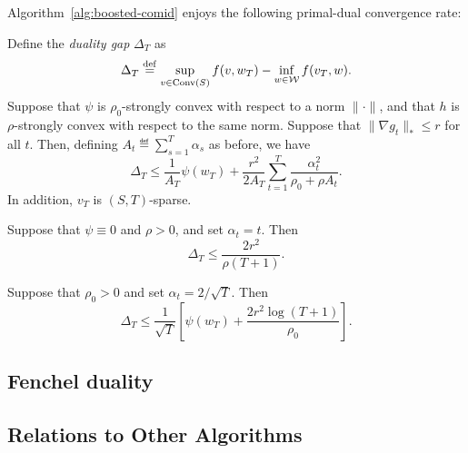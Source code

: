 \documentclass[paper.tex]{subfiles}
\begin{document}
Algorithm~\ref{alg:boosted-comid} enjoys the following primal-dual convergence rate:
\begin{theorem}
Define the \emph{duality gap} $\Delta_T$ as
\[ \Delta_T \stackrel{\mathrm{def}}{=} \sup_{v \in \operatorname{Conv}(S)} f(v, w_T) - \inf_{w \in \mathcal{W}} f(v_T, w). \]
Suppose that $\psi$ is $\rho_0$-strongly convex with 
respect to a norm $\|\cdot\|$, and that $h$ is $\rho$-strongly 
convex with respect to the same norm. Suppose that 
$\|\nabla g_t\|_* \leq r$ for all $t$. Then, defining 
$A_t \eqdef \sum_{s=1}^T \alpha_s$ as before, we have
\[ \Delta_T \leq \frac{1}{A_T} \psi(w_T) + \frac{r^2}{2A_T} \sum_{t=1}^T \frac{\alpha_t^2}{\rho_0 + \rho A_t}. \]
In addition, $v_T$ is $(S, T)$-sparse.
\end{theorem}
\begin{corollary}
Suppose that $\psi \equiv 0$ and $\rho > 0$, and set $\alpha_t = t$. Then 
\[ \Delta_T \leq \frac{2r^2}{\rho (T+1)}. \]
\end{corollary}

\begin{corollary} \label{cor:duality-cor-2} %
Suppose that $\rho_0 > 0$ and set $\alpha_t = 2/\sqrt{T}$. Then
\[ \Delta_T \leq \frac{1}{\sqrt{T}} \left[ \psi(w_T) + \frac{2r^2\log(T+1)}{\rho_0} \right]. \]
\end{corollary}

\subsection{Fenchel duality}
\label{sec:fenchel}

\subsection{Relations to Other Algorithms}
\label{sec:derived}
\end{document}
